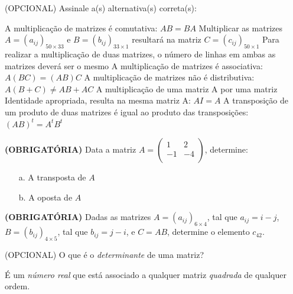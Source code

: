 \documentclass[pdftex, brazil, 12pt, oneside, addpoints]{exam}
\begin{document}
\begin{questions}
\ifprintanswers
\else
\newpage
\fi

\question
(OPCIONAL) Assinale a(s) alternativa(s) correta(s):
\begin{checkboxes}
  \choice A multiplicação de matrizes é comutativa: $AB = BA$
  \CorrectChoice Multiplicar as matrizes $A = (a_{ij})_{50 \times 33}$ e $B = (b_{ij})_{33 \times 1}$
  resultará na matriz $C = (c_{ij})_{50 \times 1}$
  \choice Para realizar a multiplicação de duas matrizes, o número de linhas
  em ambas as matrizes deverá ser o mesmo
  \CorrectChoice A multiplicação de matrizes é associativa: $A(BC) = (AB)C$
  \choice A multiplicação de matrizes não é distributiva: $A(B + C) \ne AB + AC$
  \CorrectChoice A multiplicação de uma matriz A por uma matriz Identidade apropriada,
  resulta na mesma matriz A: $AI = A$
  \CorrectChoice A transposição de um produto de duas matrizes é igual ao produto
  das transposições: $(AB)^t = A^tB^t$
\end{checkboxes}

\question
\textbf{(OBRIGATÓRIA)} Data a matriz
$A = \begin{pmatrix}
  1 & 2\\
  -1 & -4\\
\end{pmatrix}$, determine:
\begin{itemize}
\item[a.] A transposta de $A$
\item[b.] A oposta de $A$
\end{itemize}

\question
\textbf{(OBRIGATÓRIA)} Dadas as matrizes $A = (a_{ij})_{6 \times 4}$, tal que $a_{ij} = i - j$, $B = (b_{ij})_{4 \times 5}$,
tal que $b_{ij} = j - i$, e $C = AB$, determine o elemento $c_{42}$.



\question
(OPCIONAL) O que é o \emph{determinante} de uma matriz?
\begin{solution}
  É um \emph{número real} que está associado a qualquer matriz \emph{quadrada}
  de qualquer ordem.
\end{solution}


\end{questions}
\end{document}
